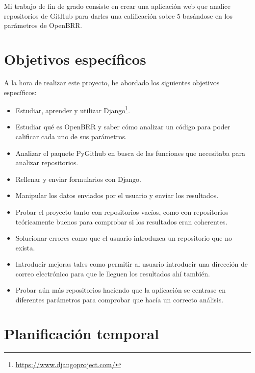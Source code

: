 \documentclass[a4paper, 12pt]{book}
\begin{document}
Mi trabajo de fin de grado consiste en crear una aplicación web que analice repositorios de GitHub para darles una calificación sobre 5 basándose en los parámetros de OpenBRR.


\section{Objetivos específicos}
\label{sec:objetivos-especificos}

A la hora de realizar este proyecto, he abordado los siguientes objetivos específicos:

\begin{itemize}
	\item Estudiar, aprender y utilizar Django\footnote{\url{https://www.djangoproject.com/}}.

	\item Estudiar qué es OpenBRR y saber cómo analizar un código para poder calificar cada uno de sus parámetros.
	
	\item Analizar el paquete PyGithub en busca de las funciones que necesitaba para analizar repositorios.

	\item Rellenar y enviar formularios con Django.

	\item Manipular los datos enviados por el usuario y enviar los resultados.

	\item Probar el proyecto tanto con repositorios vacíos, como con repositorios teóricamente buenos para comprobar si los resultados eran coherentes.

	\item Solucionar errores como que el usuario introduzca un repositorio que no exista.

	\item Introducir mejoras tales como permitir al usuario introducir una dirección de correo electrónico para que le lleguen los resultados ahí también.

	\item Probar aún más repositorios haciendo que la aplicación se centrase en diferentes parámetros para comprobar que hacía un correcto análisis.
\end{itemize}


\section{Planificación temporal}
\label{sec:planificacion-temporal}
\end{document}
